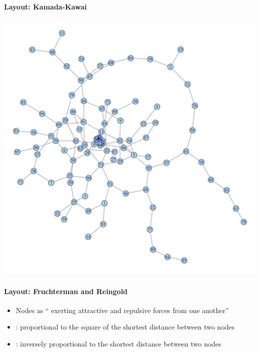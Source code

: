 \documentclass[8pt]{beamer}
\begin{document}

\begin{frame}
\frametitle{\insertsection}
\framesubtitle{Layout: Kamada-Kawai}

\centering
\includegraphics[height=0.85\textheight]{kamada}
 
\end{frame}


\begin{frame}
\frametitle{\insertsection}
\framesubtitle{Layout: Fruchterman and Reingold}

{}
    \begin{itemize}
    \item Nodes as ``{\color{blue}{atomic particles or celestial bodies}} exerting attractive and repulsive forces from one another''
    \item {\color{blue}{Attractive forces}}: proportional to the square of the shortest distance between two nodes
    \item {\color{blue}{Repulsive forces}}: inversely proportional to the shortest distance between two nodes
    \end{itemize}

\end{frame}
\end{document}
